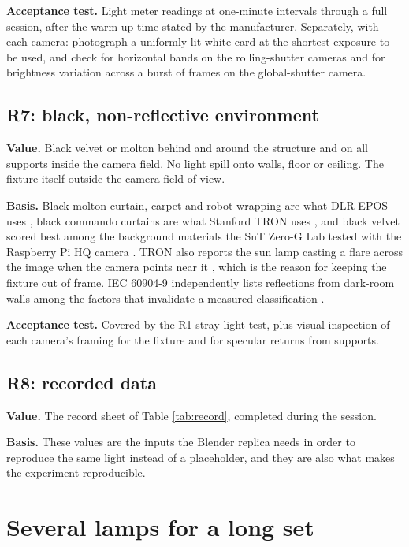 \textbf{Acceptance test.} Light meter readings at one-minute intervals through a full session, after the warm-up time stated by the manufacturer. Separately, with each camera: photograph a uniformly lit white card at the shortest exposure to be used, and check for horizontal bands on the rolling-shutter cameras and for brightness variation across a burst of frames on the global-shutter camera.

\subsection{R7: black, non-reflective environment}
\label{sec:r7}

\textbf{Value.} Black velvet or molton behind and around the structure and on all supports inside the camera field. No light spill onto walls, floor or ceiling. The fixture itself outside the camera field of view.

\textbf{Basis.} Black molton curtain, carpet and robot wrapping are what DLR EPOS uses \cite{benninghoff2017epos,dlr2025eposportfolio}, black commando curtains are what Stanford TRON uses \cite{park2021tron}, and black velvet scored best among the background materials the SnT Zero-G Lab tested with the Raspberry Pi HQ camera \cite{pauly2022spacelab}. TRON also reports the sun lamp casting a flare across the image when the camera points near it \cite{park2021tron}, which is the reason for keeping the fixture out of frame. IEC 60904-9 independently lists reflections from dark-room walls among the factors that invalidate a measured classification \cite{iec60904_9_2020}.

\textbf{Acceptance test.} Covered by the R1 stray-light test, plus visual inspection of each camera's framing for the fixture and for specular returns from supports.

\subsection{R8: recorded data}
\label{sec:r8}

\textbf{Value.} The record sheet of Table \ref{tab:record}, completed during the session.

\textbf{Basis.} These values are the inputs the Blender replica needs in order to reproduce the same light instead of a placeholder, and they are also what makes the experiment reproducible.

\section{Several lamps for a long set}
\label{sec:multi-lamp}

